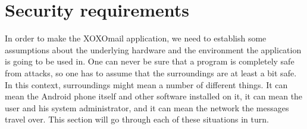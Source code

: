 \section{Security requirements}

In order to make the XOXOmail application, we need to establish some assumptions about the underlying hardware and the environment the application is going to be used in. One can never be sure that a program is completely safe from attacks, so one has to assume that the surroundings are at least a bit safe. In this context, surroundings might mean a number of different things. It can mean the Android phone itself and other software installed on it, it can mean the user and his system administrator, and it can mean the network the messages travel over. This section will go through each of these situations in turn.

